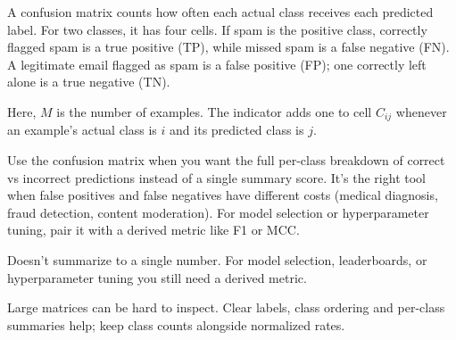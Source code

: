 \thispagestyle{classificationstyle}
\label{sec:confusion-matrix}
A confusion matrix counts how often each actual class receives each predicted label. For two classes, it has four cells. If spam is the positive class, correctly flagged spam is a true positive (TP), while missed spam is a false negative (FN). A legitimate email flagged as spam is a false positive (FP); one correctly left alone is a true negative (TN).

\begin{metricformula}
\end{metricformula}

Here, $M$ is the number of examples. The indicator adds one to cell $C_{ij}$ whenever an example's actual class is $i$ and its predicted class is $j$.


Use the confusion matrix when you want the full per-class breakdown of correct vs incorrect predictions instead of a single summary score. It's the right tool when false positives and false negatives have different costs (medical diagnosis, fraud detection, content moderation). For model selection or hyperparameter tuning, pair it with a derived metric like F1 or MCC.

{
\item Doesn't summarize to a single number. For model selection, leaderboards, or hyperparameter tuning you still need a derived metric.
\item Large matrices can be hard to inspect. Clear labels, class ordering and per-class summaries help; keep class counts alongside normalized rates.
}
\metricsecondpage
\thispagestyle{customstyle}

